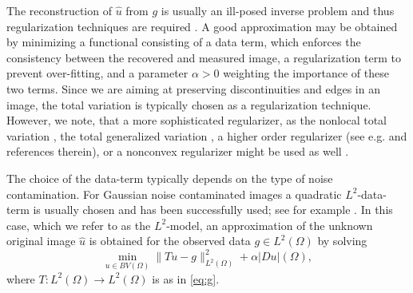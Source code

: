 \documentclass[enabledeprecatedfontcommands,cleardoublepage=empty,headsepline,twoside,11pt,DIV=15,BCOR=12mm,final]{scrartcl}
\begin{document}
The reconstruction of $\hat{u}$ from $g$ is usually an ill-posed inverse problem and thus regularization techniques are required \cite{EngHanNeu}. A good approximation may be obtained by minimizing a functional consisting of a data term, which enforces the consistency between the recovered and measured image, a regularization term to prevent over-fitting, and a parameter $\alpha>0$ weighting the importance of these two terms. Since we are aiming at preserving discontinuities and edges in an image, the total variation is typically chosen as a regularization technique. However, we note, that a more sophisticated regularizer, as the nonlocal total variation \cite{KinOshJon}, the total generalized variation \cite{BreKunPoc}, a higher order regularizer (see e.g. \cite{PapSch} and references therein), or a nonconvex regularizer might be used as well \cite{}. 

The choice of the data-term typically depends on the type of noise contamination. For Gaussian noise contaminated images a quadratic $L^2$-data-term is usually chosen and has been successfully used; see for example \cite{Cha, ChaDar, ChaLio, ChaGolMul, ComWaj, DarSig05, DarSig06, DauTesVes, DobVog, GolOsh, HinSta, Nes, OshBurGolXuYin, WeiBlaAub}. In this case, which we refer to as the $L^2$-model, an approximation of the unknown original image $\hat{u}$ is obtained for the observed data $g \in L^2(\Omega)$ by solving 
\begin{equation}\label{L2TV}
\min_{u\in BV(\Omega)} \|Tu-g\|_{L^2(\Omega)}^2 + \alpha |Du|(\Omega),
\end{equation}
where $T : L^2(\Omega) \to L^2(\Omega)$ is as in \eqref{eq:g}. 
\end{document}
